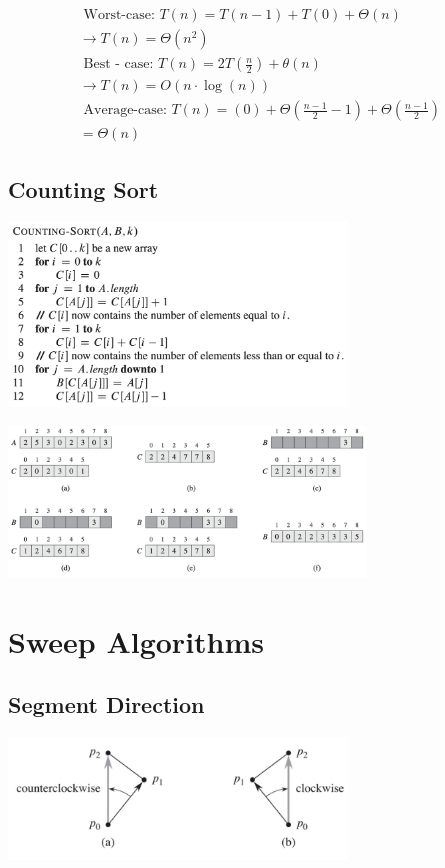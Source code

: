 \documentclass[10pt,a4paper,twocolumn]{article}
\begin{document}
$$
\begin{array}{l}\text
	{ Worst-case: } T(n)=T(n-1)+T(0)+\Theta(n)\\ \rightarrow T(n)=\Theta\left(n^{2}\right) \\ \text
	{ Best - case: } T(n)=2 T\left(\frac{n}{2}\right)+\theta(n)\\ \rightarrow T(n)=O(n \cdot \log (n)) \\ \text { Average-case: } T(n) = (0)+\Theta\left(\frac{n-1}{2}-1\right)+\Theta\left(\frac{n-1}{2}\right)\\=\Theta(n)\end{array}
$$


\subsection{Counting Sort}
\begin{center}
	\includegraphics[width=9cm]{images/counting-sort}
\end{center}

\begin{center}
	\includegraphics[width=9.5cm]{images/counting-sort-example}
\end{center}



\section{Sweep Algorithms}
\subsection{Segment Direction}
\begin{center}
	\includegraphics[width=9cm]{images/segment-direction}
\end{center}
\end{document}

